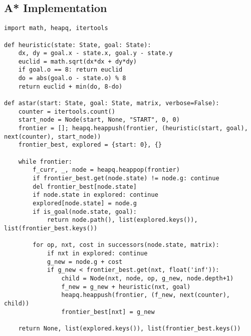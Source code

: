 \documentclass[11pt,a4paper]{article}
\begin{document}
\subsection{A* Implementation}
\begin{lstlisting}
import math, heapq, itertools

def heuristic(state: State, goal: State):
    dx, dy = goal.x - state.x, goal.y - state.y
    euclid = math.sqrt(dx*dx + dy*dy)
    if goal.o == 8: return euclid
    do = abs(goal.o - state.o) % 8
    return euclid + min(do, 8-do)

def astar(start: State, goal: State, matrix, verbose=False):
    counter = itertools.count()
    start_node = Node(start, None, "START", 0, 0)
    frontier = []; heapq.heappush(frontier, (heuristic(start, goal), next(counter), start_node))
    frontier_best, explored = {start: 0}, {}
    
    while frontier:
        f_curr, _, node = heapq.heappop(frontier)
        if frontier_best.get(node.state) != node.g: continue
        del frontier_best[node.state]
        if node.state in explored: continue
        explored[node.state] = node.g
        if is_goal(node.state, goal):
            return node.path(), list(explored.keys()), list(frontier_best.keys())
        
        for op, nxt, cost in successors(node.state, matrix):
            if nxt in explored: continue
            g_new = node.g + cost
            if g_new < frontier_best.get(nxt, float('inf')):
                child = Node(nxt, node, op, g_new, node.depth+1)
                f_new = g_new + heuristic(nxt, goal)
                heapq.heappush(frontier, (f_new, next(counter), child))
                frontier_best[nxt] = g_new
    
    return None, list(explored.keys()), list(frontier_best.keys())
\end{lstlisting}
\end{document}
